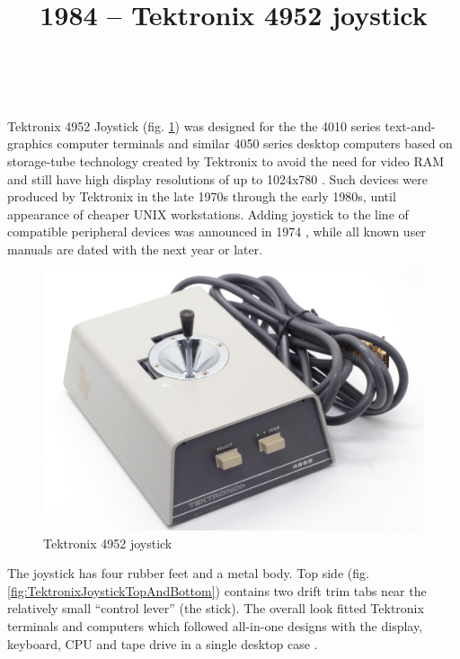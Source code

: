 \documentclass[11pt, a4paper]{article}
\begin{document}
\title{1984 -- Tektronix 4952 joystick}
\date{}
\author{~}
\maketitle
{}

Tektronix 4952 Joystick (fig. \ref{fig:TektronixJoystickPic}) was designed for the the 4010 series text-and-graphics computer terminals and similar 4050 series desktop computers based on storage-tube technology created by Tektronix to avoid the need for video RAM and still have high display resolutions of up to 1024x780 \cite{wiki}. Such devices were produced by Tektronix in the late 1970s through the early 1980s, until appearance of cheaper UNIX workstations. Adding joystick to the line of compatible peripheral devices was announced in 1974 \cite{adv}, while all known user manuals are dated with the next year or later.

\begin{figure}[h]
   \centering
    \includegraphics[scale=0.5]{1975_Tektronix_4952_Joystick/pic_30.jpg}
    \caption{Tektronix 4952 joystick}
    \label{fig:TektronixJoystickPic}
\end{figure}

The joystick has four rubber feet and a metal body. Top side (fig. \ref{fig:TektronixJoystickTopAndBottom}) contains two drift trim tabs \cite{manual} near the relatively small ``control lever'' (the stick). The overall look fitted Tektronix terminals and computers which followed all-in-one designs with the display, keyboard, CPU and tape drive in a single desktop case \cite{wiki}.
\end{document}
